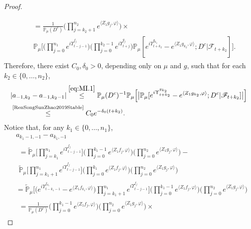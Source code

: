\documentclass[12pt,a4paper]{amsart}
\theoremstyle{plain}
\theoremstyle{definition}
\numberwithin{equation}{section}
\begin{document}
\begin{proof}
\begin{align}
\begin{multlined}
	\end{multlined}
	\\ \label{eq:MI.1}& \begin{multlined}
	= \frac{1}{\mathbb{P}_{\mu}(D^c)}  \Big(\prod_{j=k_2+1}^{n_2}e^{\langle Z_1g_j, \varphi\rangle}\Big) \times {}
	\\ \mathbb{P}_{\mu}\Big[\Big(\prod_{j=0}^{n_1}e^{i\Upsilon_{t-j-1}^{f_j}}\Big)\Big(\prod_{j=0}^{k_2-1} e^{i\Upsilon_{t+j}^{g_j}}\Big) \mathbb P_\mu[e^{i\Upsilon^{g_{k_2}}_{t+k_2}}-e^{\langle Z_1g_{k_2}, \varphi\rangle}; D^c|\mathscr F_{t+k_2}] \Big].
	\end{multlined}
\end{align}
	Therefore, there exist $C_0,\delta_0 >0$,  depending only on $\mu$ and $g$,
  such that  for each $k_2 \in \{0, \dots, n_2 \}$,
\begin{align}
    &| a_{-1,k_2} - a_{-1,k_2-1}|
    \overset{\eqref{eq:MI.1}}\leq \mathbb{P}_{\mu}(D^c)^{-1}\mathbb{P}_{\mu}\Big[\big|\mathbb P_\mu[e^{i\Upsilon^{g_{k_2}}_{t+k_2}}-e^{\langle Z_1g_{k_2}, \varphi\rangle}; D^c|\mathscr F_{t+k_2}]\big|\Big]
    \\&\label{eq:MI.15}\overset{\text{\cite[Proposition 3.5]{RenSongSunZhao2019Stable}}}\leq C_0 e^{-\delta_0 (t+k_2)}.
\end{align}
	Notice that, for any $k_1 \in \{0, \dots , n_1\}$,
	\begin{align}
	&a_{k_1-1,-1} - a_{k_1,-1}
	\\ & \begin{multlined}
	=  \mathbb{\widetilde{P}}_{\mu}\Big[ \prod_{j=k_1}^{n_1} e^{i\Upsilon_{t-j-1}^{f_j}} \Big] \Big(\prod_{j=0}^{k_1-1}e^{\langle Z_1 f_j, \varphi\rangle}\Big) \Big(\prod_{j=0}^{n_2} e^{ \langle Z_1g_j,\varphi \rangle} \Big) - {}
	\\ \mathbb{\widetilde{P}}_{\mu}\Big[ \prod_{j=k_1+1}^{n_1} e^{i\Upsilon_{t-j-1}^{f_j}} \Big] \Big(\prod_{j=0}^{k_1}e^{\langle Z_1 f_j, \varphi\rangle}\Big) \Big(\prod_{j=0}^{n_2} e^{ \langle Z_1g_j,\varphi \rangle} \Big)
	\end{multlined}
	\\& =  \mathbb{\widetilde{P}}_{\mu}\Big[ \big(e^{i\Upsilon_{t-k_1-1}^{f_{k_1}}} -e^{\langle Z_1 f_{k_1}, \varphi\rangle} \big) \prod_{j=k_1+1}^{n_1} e^{i\Upsilon_{t-j-1}^{f_j}} \Big] \Big(\prod_{j=0}^{k_1-1}e^{\langle Z_1 f_j, \varphi\rangle}\Big) \Big(\prod_{j=0}^{n_2} e^{ \langle Z_1g_j,\varphi \rangle} \Big)
	\\& \label{eq:MI.2}\begin{multlined}
	=  \frac{1}{\mathbb P_\mu(D^c)} \Big(\prod_{j=0}^{k_1-1}e^{\langle Z_1 f_j, \varphi\rangle}\Big) \Big(\prod_{j=0}^{n_2} e^{ \langle Z_1g_j,\varphi \rangle} \Big) \times {}

\end{multlined}
\end{align}
\end{proof}
\end{document}
